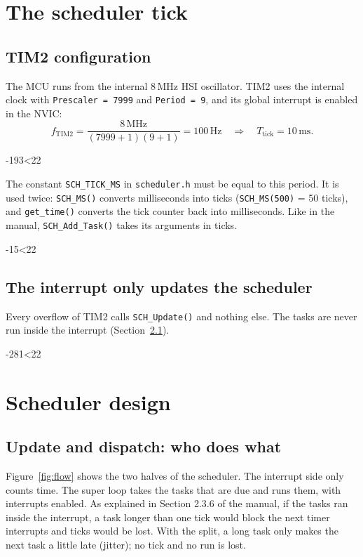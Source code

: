 \documentclass[12pt,a4paper]{article}
\numberwithin{figure}{section}
\numberwithin{table}{section}
\newcommand{\srcbody}[4]{}
\newcommand{\src}[4]{\par\ifnum\numexpr#3-#2\relax<22 \noindent\begin{minipage}{\linewidth}\srcbody{#1}{#2}{#3}{#4}\end{minipage}\else\srcbody{#1}{#2}{#3}{#4}\fi\par}
\newcommand{\code}[1]{\texttt{#1}}
\newcommand{\report}[1]{\subsection*{#1}}
\begin{document}
\section{The scheduler tick}
\label{sec:tick}
\report{TIM2 configuration}
The MCU runs from the internal 8\,MHz HSI oscillator. TIM2 uses the internal clock with \code{Prescaler = 7999} and \code{Period = 9}, and its global interrupt is enabled in the NVIC:
\[
f_{\mathrm{TIM2}} = \frac{8\,\mathrm{MHz}}{(7999+1)(9+1)} = 100\,\mathrm{Hz} \quad\Rightarrow\quad T_{\mathrm{tick}} = 10\,\mathrm{ms}.
\]
\src{main.c}{193}{196}{TIM2 parameters generated by CubeMX}

The constant \code{SCH\_TICK\_MS} in \code{scheduler.h} must be equal to this period. It is used twice: \code{SCH\_MS()} converts milliseconds into ticks (\code{SCH\_MS(500)} = 50 ticks), and \code{get\_time()} converts the tick counter back into milliseconds. Like in the manual, \code{SCH\_Add\_Task()} takes its arguments in ticks.
\src{scheduler.h}{15}{21}{Configuration constants of the scheduler}

\report{The interrupt only updates the scheduler}
Every overflow of TIM2 calls \code{SCH\_Update()} and nothing else. The tasks are never run inside the interrupt (Section~\ref{sec:split}).
\src{main.c}{281}{288}{The TIM2 callback}

\section{Scheduler design}
\label{sec:sched}

\subsection{Update and dispatch: who does what}
\label{sec:split}
Figure~\ref{fig:flow} shows the two halves of the scheduler. The interrupt side only counts time. The super loop takes the tasks that are due and runs them, with interrupts enabled. As explained in Section 2.3.6 of the manual, if the tasks ran inside the interrupt, a task longer than one tick would block the next timer interrupts and ticks would be lost. With the split, a long task only makes the next task a little late (jitter); no tick and no run is lost.
\end{document}

